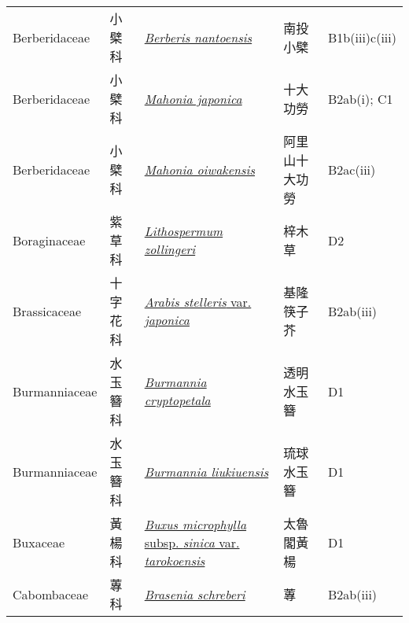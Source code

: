 {\begin{longtable}{p{2.5cm}p{2.5cm}p{4.5cm}p{2.5cm}p{3cm}}
    Berberidaceae & 小檗科 & \href{http://www.theplantlist.org/tpl1.1/search?q=Berberis+nantoensis}{\textit{Berberis nantoensis} } & 南投小檗 & B1b(iii)c(iii) \index{Berberis@\textit{Berberis}!nantoensis@\textit{nantoensis}}  \index{南投小檗} \\
    Berberidaceae & 小檗科 & \href{http://www.theplantlist.org/tpl1.1/search?q=Mahonia+japonica}{\textit{Mahonia japonica} } & 十大功勞 & B2ab(i); C1 \index{Mahonia@\textit{Mahonia}!japonica@\textit{japonica}}  \index{十大功勞} \\
    Berberidaceae & 小檗科 & \href{http://www.theplantlist.org/tpl1.1/search?q=Mahonia+oiwakensis}{\textit{Mahonia oiwakensis} } & 阿里山十大功勞 & B2ac(iii) \index{Mahonia@\textit{Mahonia}!oiwakensis@\textit{oiwakensis}}  \index{阿里山十大功勞} \\
    Boraginaceae & 紫草科 & \href{http://www.theplantlist.org/tpl1.1/search?q=Lithospermum+zollingeri}{\textit{Lithospermum zollingeri} } & 梓木草 & D2 \index{Lithospermum@\textit{Lithospermum}!zollingeri@\textit{zollingeri}}  \index{梓木草} \\
    Brassicaceae & 十字花科 & \href{http://www.theplantlist.org/tpl1.1/search?q=Arabis+stelleris+var.+japonica}{\textit{Arabis stelleris} var. \textit{japonica} } & 基隆筷子芥 & B2ab(iii) \index{Arabis@\textit{Arabis}!stelleris@\textit{stelleris}!var. japonica@var. \textit{japonica}}  \index{基隆筷子芥} \\
    Burmanniaceae & 水玉簪科 & \href{http://www.theplantlist.org/tpl1.1/search?q=Burmannia+cryptopetala}{\textit{Burmannia cryptopetala} } & 透明水玉簪 & D1 \index{Burmannia@\textit{Burmannia}!cryptopetala@\textit{cryptopetala}}  \index{透明水玉簪} \\
    Burmanniaceae & 水玉簪科 & \href{http://www.theplantlist.org/tpl1.1/search?q=Burmannia+liukiuensis}{\textit{Burmannia liukiuensis} } & 琉球水玉簪 & D1 \index{Burmannia@\textit{Burmannia}!liukiuensis@\textit{liukiuensis}}  \index{琉球水玉簪} \\
    Buxaceae & 黃楊科 & \href{http://www.theplantlist.org/tpl1.1/search?q=Buxus+microphylla+subsp.+sinica+var.+tarokoensis}{\textit{Buxus microphylla} subsp. \textit{sinica} var. \textit{tarokoensis} } & 太魯閣黃楊 & D1 \index{Buxus@\textit{Buxus}!microphylla@\textit{microphylla}!subsp. sinica@subsp. \textit{sinica}!var. tarokoensis@var. \textit{tarokoensis}}  \index{太魯閣黃楊} \\
    Cabombaceae & 蓴科 & \href{http://www.theplantlist.org/tpl1.1/search?q=Brasenia+schreberi}{\textit{Brasenia schreberi} } & 蓴 & B2ab(iii) \index{Brasenia@\textit{Brasenia}!schreberi@\textit{schreberi}}  \index{蓴} \\

\end{longtable}}
